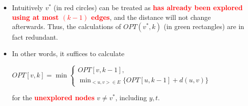 \documentclass[mathserif]{beamer}
\begin{document}
{\begin{figure}
 
\end{figure}

\begin{itemize}
\item  Intuitively $v^*$ (in red circles) can be treated as \textcolor{red}{\bf has already been explored using at most $(k-1)$ edges}, and the distance will not change afterwards.
  Thus, the calculations of $OPT(v^*, k)$ (in green rectangles) are in fact redundant.
\item In other words, it suffices to calculate \begin{small} $OPT[v, k] = \min \begin{cases}
			OPT[v, k-1], \\
			\min_{<u,v>\in E} \{OPT[ u, k-1 ] + d(u,v) \} 
		\end{cases}$
		\end{small} for the \textcolor{red}{\bf unexplored nodes} $v \neq v^*$, including $y, t$.
\end{itemize}
}
\end{document}
